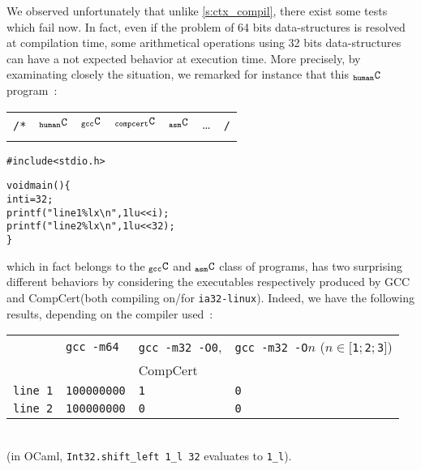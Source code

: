 \documentclass[a4paper, 11pt]{article}
\newenvironment{humC}
  {%
   \begin{alltt}
   \footnotesize}
  {\end{alltt} %
  }
\newcommand{\ccert}{CompCert\xspace}
\newcommand{\yes}{\ding{51}}
\newcommand{\C}{$_{\tt compcert}{\tt C}$\xspace}
\newcommand{\gccC}{$_{\tt gcc}{\tt C}$\xspace}
\newcommand{\hC}{$_{\tt human}{\tt C}$\xspace}
\newcommand{\aC}{$_{\tt asm}{\tt C}$\xspace}
\begin{document}
We observed unfortunately that unlike \ref{s:ctx_compil}, there exist some tests which fail now. In fact, even if the problem of 64 bits data-structures is resolved at compilation time, some arithmetical operations using 32 bits data-structures can have a not expected behavior at execution time.
More precisely, by examinating closely the situation, we remarked for instance that this \hC program~:
{\newline\tiny
\begin{tabular}{rc|c|c|c|cl}
\multirow{2}{*}{{\footnotesize{\tt /*}}} & \hC  & \gccC  & \C & \aC & \ldots & \multirow{2}{*}{{\footnotesize{\tt */}}} \\
 & \yes & \yes & \yes & \yes & \\
\end{tabular}}
\begin{humC}
#include <stdio.h>

void main() \{
  int i = 32;
  printf("line 1 \%lx\textbackslash{}n", 1lu <<  i);
  printf("line 2 \%lx\textbackslash{}n", 1lu << 32);
\}
\end{humC}
which in fact belongs to the \gccC and \aC class of programs, has two surprising different behaviors by considering the executables respectively produced by GCC and \ccert (both compiling on/for \verb|ia32-linux|). Indeed, we have the following results, depending on the compiler used~:\\
\begin{tabular}{l|l|l|l}
& \verb|gcc -m64| & \verb|gcc -m32 -O0|, & \verb|gcc -m32 -O|$n$ ($n\in[$\verb|1|$; $\verb|2|$; $\verb|3|$]$) \\
&& \ccert & \\
\hline
\verb|line 1| & \verb|100000000| & \verb|1| & \verb|0| \\
\verb|line 2| & \verb|100000000| & \verb|0| & \verb|0| \\
\end{tabular} \\
(in OCaml, \verb|Int32.shift_left 1_l 32| evaluates to \verb|1_l|).
\end{document}
